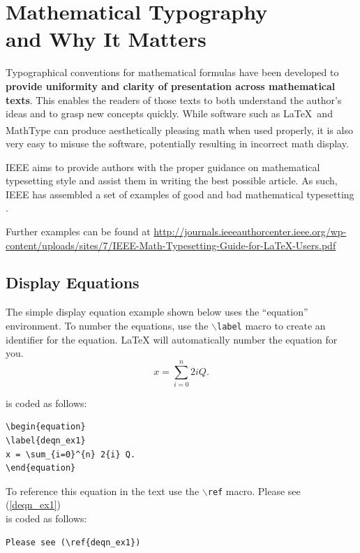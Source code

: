 \documentclass[lettersize,journal]{IEEEtran}
\begin{document}
\section{Mathematical Typography \\ and Why It Matters}

Typographical conventions for mathematical formulas have been developed to {\bf
    provide uniformity and clarity of presentation across mathematical texts}. This
enables the readers of those texts to both understand the author's ideas and to
grasp new concepts quickly. While software such as \LaTeX \ and
MathType\textsuperscript{\textregistered} can produce aesthetically pleasing
math when used properly, it is also very easy to misuse the software,
potentially resulting in incorrect math display.

IEEE aims to provide authors with the proper guidance on mathematical
typesetting style and assist them in writing the best possible article. As
such, IEEE has assembled a set of examples of good and bad mathematical
typesetting \cite{ref1,ref2,ref3,ref4,ref5}.

Further examples can be found at
\url{http://journals.ieeeauthorcenter.ieee.org/wp-content/uploads/sites/7/IEEE-Math-Typesetting-Guide-for-LaTeX-Users.pdf}

\subsection{Display Equations}
The simple display equation example shown below uses the ``equation''
environment. To number the equations, use the $\backslash${\tt{label}} macro to
create an identifier for the equation. LaTeX will automatically number the
equation for you.
\begin{equation}
  \label{deqn_ex1}
  x = \sum_{i=0}^{n} 2{i} Q.
\end{equation}

\noindent is coded as follows:
\begin{verbatim}
\begin{equation}
\label{deqn_ex1}
x = \sum_{i=0}^{n} 2{i} Q.
\end{equation}
\end{verbatim}

To reference this equation in the text use the $\backslash${\tt{ref}} macro.
Please see (\ref{deqn_ex1})\\ \noindent is coded as follows:
\begin{verbatim}
Please see (\ref{deqn_ex1})\end{verbatim}
\end{document}
